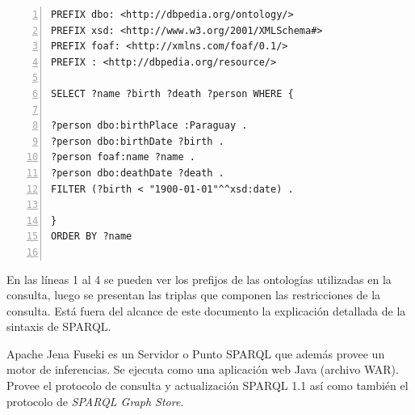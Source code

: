 \lstset{
    language=SPARQL
}
\noindent\begin{minipage}{\textwidth}
\begin{lstlisting}[captionpos=b, caption=Ejemplo de consulta SPARQL, label=lst:consulta-sparql,  numbers=left,  numberstyle=\tiny\color{mygray},
    basicstyle=\footnotesize\ttfamily,frame=single]
PREFIX dbo: <http://dbpedia.org/ontology/>
PREFIX xsd: <http://www.w3.org/2001/XMLSchema#>
PREFIX foaf: <http://xmlns.com/foaf/0.1/>
PREFIX : <http://dbpedia.org/resource/>

SELECT ?name ?birth ?death ?person WHERE { 

?person dbo:birthPlace :Paraguay . 
?person dbo:birthDate ?birth . 
?person foaf:name ?name . 
?person dbo:deathDate ?death . 
FILTER (?birth < "1900-01-01"^^xsd:date) . 

}
ORDER BY ?name
 
\end{lstlisting}
\end{minipage}

En las líneas 1 al 4 se pueden ver los prefijos de las ontologías utilizadas en la consulta, luego se presentan las triplas que componen las restricciones de la consulta. Está fuera del alcance de este documento la explicación detallada de la sintaxis de SPARQL.

Apache Jena Fuseki es un Servidor o Punto SPARQL que además provee un motor de inferencias. Se ejecuta como una aplicación web Java (archivo WAR). Provee el protocolo de consulta y actualización SPARQL 1.1 así como también el protocolo de \textit{SPARQL Graph Store}.
